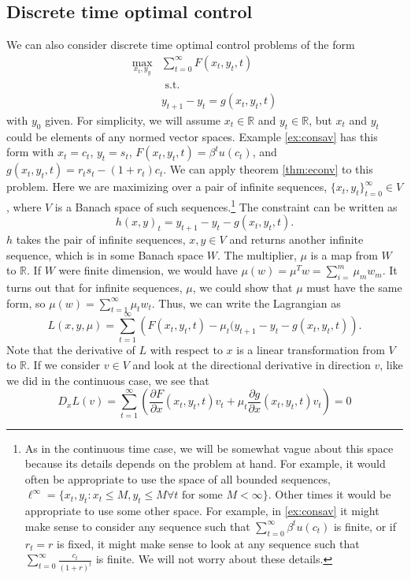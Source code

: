 \documentclass[12pt,reqno]{amsart}
\theoremstyle{definition}
\def\R{\mathbb{R}}
\begin{document}
\subsection{Discrete time optimal control}
We can also consider discrete time optimal control problems of the
form
\begin{align*}
  \max_{x_t,y_y} & \sum_{t=0}^\infty F(x_t,y_t,t) \\
  & \text{ s.t. } \\
  & y_{t+1} - y_t = g(x_t,y_t,t) 
\end{align*}
with $y_0$ given. For simplicity, we will assume $x_t \in \R$ and $y_t \in
\R$, but $x_t$ and $y_t$ could be elements of any normed vector
spaces. Example \ref{ex:consav} has this form with $x_t = c_t$, $y_t =
s_t$, 
$F(x_t,y_t,t) = \beta^t u(c_t)$, and 
$g(x_t,y_t,t) = r_t s_t -(1+r_t)c_t$. 
We can apply theorem \ref{thm:econv} to this problem. Here we are
maximizing over a pair of infinite sequences,
$\{x_t,y_t\}_{t=0}^\infty \in V$, where $V$ is a Banach space of such
sequences.\footnote{As in the continuous time case, we will be somewhat vague
about this space because its details depends on the problem at
hand. For example, it would often be appropriate to use the space of
all bounded sequences, $\ell^\infty =\{x_t,y_t: x_t \leq M, y_t \leq M
\forall t \text{ for some } M <\infty \}$. Other times it would be
appropriate to use some other space. For example, in \ref{ex:consav}
it might make sense to consider any sequence such that $\sum_{t=0}^\infty
\beta^t u(c_t)$ is finite, or if $r_t=r$ is fixed, it might make sense
to look at any sequence such that $\sum_{t=0}^\infty
\frac{c_t}{(1+r)^t}$ is finite. We will not worry about these
details.} The constraint can be written as 
\[ h(x,y)_t =  y_{t+1} - y_t - g(x_t,y_t,t).  \]
$h$ takes the pair of infinite sequences, $x,y \in V$ and returns
another infinite sequence, which is in some Banach space $W$. The
multiplier, $\mu$ is a map from $W$ to $\R$. If $W$ were finite
dimension, we would have $\mu(w) = \mu^T w = \sum_{i=}^m \mu_m
w_m$. It turns out that for infinite sequences, $\mu$, we could show
that $\mu$ must have the same form, so $\mu(w) = \sum_{t=1}^\infty
\mu_t w_t$. Thus, we can write the Lagrangian as
\[ L(x,y,\mu) = \sum_{t=1}^\infty \left(F(x_t,y_t,t) -
  \mu_t(y_{t+1}-y_t - g(x_t,y_t,t) \right). \]
Note that the derivative of $L$ with respect to $x$ is a linear
transformation from $V$ to $\R$. If we consider $v \in V$ and look at
the directional derivative in direction $v$, like we did in the
continuous case, we see that
\[ D_xL(v) = \sum_{t=1}^\infty \left(\frac{\partial F}{\partial
    x}(x_t,y_t,t)v_t  + \mu_t \frac{\partial g}{\partial
    x}(x_t,y_t,t)v_t\right) = 0 \]
\end{document}
